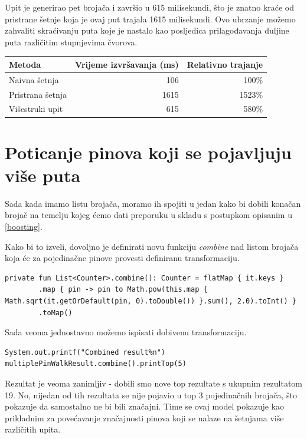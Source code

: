 \documentclass[times, utf8, seminar]{fer}
\begin{document}
Upit je generirao pet brojača i završio u 615 milisekundi, što je znatno kraće od pristrane šetnje koja je ovaj put trajala 1615 milisekundi. Ovo ubrzanje možemo zahvaliti skraćivanju puta koje je nastalo kao posljedica prilagođavanja duljine puta različitim stupnjevima čvorova.

\begin{center}
		  \begin{tabular}{ |l|r|r| }
					 \hline
					 Metoda & Vrijeme izvršavanja (ms) & Relativno trajanje\\
					 \hline
					 Naivna šetnja & 106 & 100\% \\
					 \hline
					 Pristrana šetnja & 1615 & 1523\% \\
					 \hline
					 Višestruki upit & 615 & 580\% \\
					 \hline
		  \end{tabular}
\end{center}

\section{Poticanje pinova koji se pojavljuju više puta}

Sada kada imamo listu brojača, moramo ih spojiti u jedan kako bi dobili konačan brojač na temelju kojeg ćemo dati preporuku u skladu s postupkom opisanim u \ref{boosting}.

Kako bi to izveli, dovoljno je definirati novu funkciju \textit{combine} nad listom brojača koja će za pojedinačne pinove provesti definiranu transformaciju.

\begin{lstlisting}
private fun List<Counter>.combine(): Counter = flatMap { it.keys }
        .map { pin -> pin to Math.pow(this.map { Math.sqrt(it.getOrDefault(pin, 0).toDouble()) }.sum(), 2.0).toInt() }
        .toMap()
\end{lstlisting}

Sada veoma jednostavno možemo ispisati dobivenu transformaciju.

\begin{lstlisting}
System.out.printf("Combined result%n")
multiplePinWalkResult.combine().printTop(5)
\end{lstlisting}

Rezultat je veoma zanimljiv - dobili smo nove top rezultate s ukupnim rezultatom 19. No, nijedan od tih rezultata se nije pojavio u top 3 pojedinačnih brojača, što pokazuje da samostalno ne bi bili značajni. Time se ovaj model pokazuje kao prikladnim za povećavanje značajnosti pinova koji se nalaze na šetnjama više različitih upita.
\end{document}
